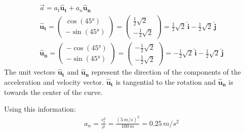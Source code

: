 \documentclass[11pt, a4paper]{article}
\begin{document}
\begin{gather}
    \vec{a} = a_t \boldsymbol{\hat{u}_t} + a_n \boldsymbol{\hat{u}_n}\\
    \boldsymbol{\hat{u}_t} =  \begin{pmatrix} \cos(\ang{45})\\ -\sin(\ang{45}) \end{pmatrix} =
        \begin{pmatrix} \frac{1}{2}\sqrt{2} \\ -\frac{1}{2}\sqrt{2}\end{pmatrix} =
        \frac{1}{2}\sqrt{2} \, \boldsymbol{\hat{i}} - \frac{1}{2}\sqrt{2} \, \boldsymbol{\hat{j}}\\
    \boldsymbol{\hat{u}_n} =  \begin{pmatrix} -\cos(\ang{45})\\ -\sin(\ang{45}) \end{pmatrix} =
        \begin{pmatrix} -\frac{1}{2}\sqrt{2} \\ -\frac{1}{2}\sqrt{2}\end{pmatrix} =
        -\frac{1}{2}\sqrt{2} \, \boldsymbol{\hat{i}} - \frac{1}{2}\sqrt{2} \, \boldsymbol{\hat{j}}
\end{gather}
The unit vectors $\boldsymbol{\hat{u}_t}$ and $\boldsymbol{\hat{u}_n}$ represent the direction of the components
of the acceleration and velocity vector. $\boldsymbol{\hat{u}_t}$ is tangential to the rotation and $\boldsymbol{\hat{u}_n}$
is towards the center of the curve.

Using this information:
\begin{gather}
    a_n = \frac{v_t^2}{\rho} = \frac{(5\,m/s)^2}{100\,m} = 0.25\,m/s^2
\end{gather}
\end{document}
